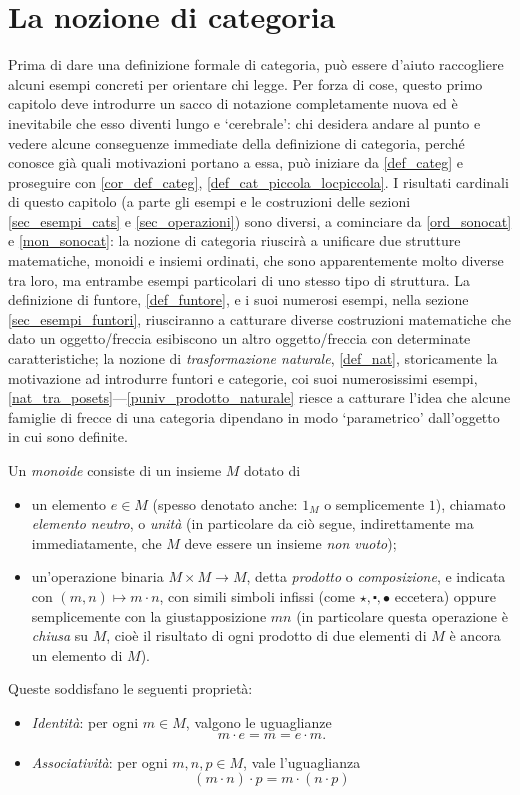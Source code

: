 \section{La nozione di categoria}\label{sec_categorie}

Prima di dare una definizione formale di categoria, può essere d'aiuto raccogliere alcuni esempi concreti per orientare chi legge. Per forza di cose, questo primo capitolo deve introdurre un sacco di notazione completamente nuova ed è inevitabile che esso diventi lungo e `cerebrale': chi desidera andare al punto e vedere alcune conseguenze immediate della definizione di categoria, perché conosce già quali motivazioni portano a essa, può iniziare da \ref{def_categ} e proseguire con \ref{cor_def_categ}, \ref{def_cat_piccola_locpiccola}. I risultati cardinali di questo capitolo (a parte gli esempi e le costruzioni delle sezioni \ref{sec_esempi_cats} e \ref{sec_operazioni}) sono diversi, a cominciare da \ref{ord_sonocat} e \ref{mon_sonocat}: la nozione di categoria riuscirà a unificare due strutture matematiche, monoidi e insiemi ordinati, che sono apparentemente molto diverse tra loro, ma entrambe esempi particolari di uno stesso tipo di struttura. La definizione di funtore, \ref{def_funtore}, e i suoi numerosi esempi, nella sezione \ref{sec_esempi_funtori}, riusciranno a catturare diverse costruzioni matematiche che dato un oggetto/freccia esibiscono un altro oggetto/freccia con determinate caratteristiche; la nozione di \emph{trasformazione naturale}, \ref{def_nat}, storicamente la motivazione ad introdurre funtori e categorie, coi suoi numerosissimi esempi, \ref{nat_tra_posets}---\ref{puniv_prodotto_naturale} riesce a catturare l'idea che alcune famiglie di frecce di una categoria dipendano in modo `parametrico' dall'oggetto in cui sono definite.
\begin{definition}\label{prelim_def_monoide}
	Un \emph{monoide} consiste di un insieme \(M\) dotato di
	\begin{itemize}
		\item un elemento \(e\in M\) (spesso denotato anche: \(1_M\) o semplicemente \(1\)), chiamato \emph{elemento neutro}, o \emph{unità} (in particolare da ciò segue, indirettamente ma immediatamente, che \(M\) deve essere un insieme \emph{non vuoto});
		\item un'operazione binaria \(M\times M\to M\), detta \emph{prodotto} o \emph{composizione}, e indicata con \((m,n)\mapsto m\cdot n\), con simili simboli infissi (come \(\star, \centerdot,\bullet\) eccetera) oppure semplicemente con la giustapposizione	\(mn\) (in particolare questa operazione è \emph{chiusa} su \(M\), cioè il risultato di ogni prodotto di due elementi di \(M\) è ancora un elemento di \(M\)).
	\end{itemize}
	Queste soddisfano le seguenti proprietà:
	\begin{itemize}
		\item \emph{Identità}: per ogni \(m\in M\), valgono le uguaglianze
		      \[m\cdot e = m = e\cdot m.\]
		\item \emph{Associatività}: per ogni \(m,n,p\in M\), vale l'uguaglianza
		      \[(m\cdot n)\cdot p = m\cdot (n\cdot p)\]
	\end{itemize}
\end{definition}
